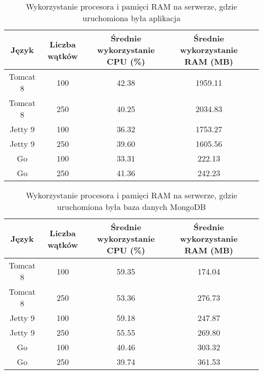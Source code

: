 
\begin{table}[!htb]
\centering
\caption{Wykorzystanie procesora i pamięci RAM na serwerze, gdzie uruchomiona była aplikacja}
\label{tab:app-clean-crud}
\begin{tabular}{@{}ccccl@{}}
\toprule
\textbf{Język} & \textbf{Liczba wątków} & \multicolumn{1}{p{3cm}}{\textbf{Średnie wykorzystanie CPU (\%)}} & \multicolumn{1}{p{3cm}}{\textbf{Średnie wykorzystanie RAM (MB)}} &  \\ \midrule
Tomcat 8       & 100                    & 42.38                             & 1959.11                          &  \\
Tomcat 8       & 250                    & 40.25                             & 2034.83                          &  \\
Jetty 9       & 100                    & 36.32                             & 1753.27                          &  \\
Jetty 9       & 250                    & 39.60                             & 1605.56                          &  \\
Go       & 100                    & 33.31                             & 222.13                          &  \\
Go       & 250                    & 41.36                             & 242.23                          &  \\
\bottomrule
\end{tabular}
\end{table}


\begin{table}[!htb]
\centering
\caption{Wykorzystanie procesora i pamięci RAM na serwerze, gdzie uruchomiona była baza danych MongoDB}
\label{tab:mongo-clean-crud}
\begin{tabular}{@{}ccccl@{}}
\toprule
\textbf{Język} & \textbf{Liczba wątków} & \multicolumn{1}{p{3cm}}{\textbf{Średnie wykorzystanie CPU (\%)}} & \multicolumn{1}{p{3cm}}{\textbf{Średnie wykorzystanie RAM (MB)}} &  \\ \midrule
Tomcat 8       & 100                    & 59.35                             & 174.04                          &  \\
Tomcat 8       & 250                    & 53.36                             & 276.73                          &  \\
Jetty 9       & 100                    & 59.18                             & 247.87                          &  \\
Jetty 9       & 250                    & 55.55                             & 269.80                          &  \\
Go       & 100                    & 40.46                             & 303.32                          &  \\
Go       & 250                    & 39.74                             & 361.53                          &  \\
\bottomrule
\end{tabular}
\end{table}

